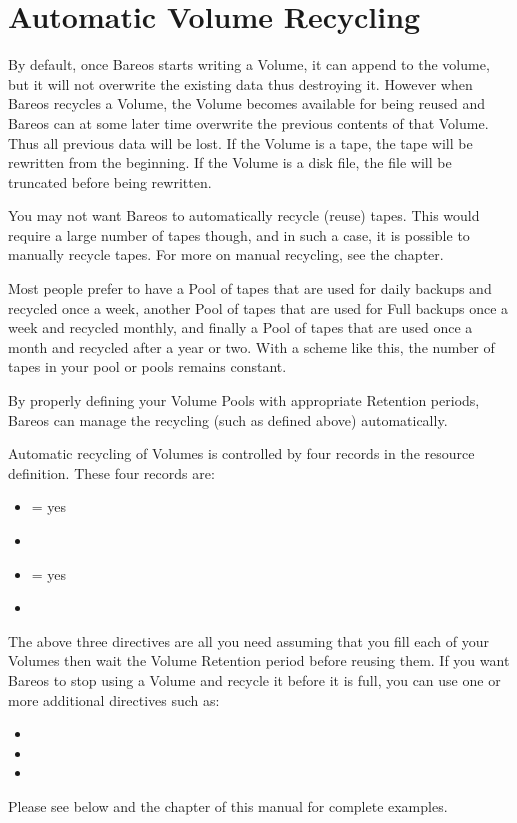 \section{Automatic Volume Recycling}
\label{RecyclingChapter}

By default, once Bareos starts writing a Volume, it can append to the
volume, but it will not overwrite the existing data thus destroying it.
However when Bareos recycles a Volume, the Volume becomes available
for being reused and Bareos can at some later time overwrite the previous
contents of that Volume.  Thus all previous data will be lost.  If the
Volume is a tape, the tape will be rewritten from the beginning.  If the
Volume is a disk file, the file will be truncated before being rewritten.

You may not want Bareos to automatically recycle (reuse) tapes.  This would
require a large number of tapes though, and in such a case, it is possible
to manually recycle tapes.  For more on manual recycling, see the  chapter.

Most people prefer to have a Pool of tapes that are used for daily backups and
recycled once a week, another Pool of tapes that are used for Full backups
once a week and recycled monthly, and finally a Pool of tapes that are used
once a month and recycled after a year or two. With a scheme like this, the
number of tapes in your pool or pools remains constant.

By properly defining your Volume Pools with appropriate Retention periods,
Bareos can manage the recycling (such as defined above) automatically.

Automatic recycling of Volumes is controlled by four records in the 
resource definition.
These four records are:

\begin{itemize}
\item {} = yes
\item {}
\item {} = yes
\item {}
\end{itemize}

The above three directives are all you need assuming that you fill
each of your Volumes then wait the Volume Retention period before
reusing them.  If you want Bareos to stop using a Volume and recycle
it before it is full, you can use one or more additional
directives such as:
\begin{itemize}
\item {}
\item {}
\item {}
\end{itemize}
Please see below and
the  chapter
of this manual for complete examples.

